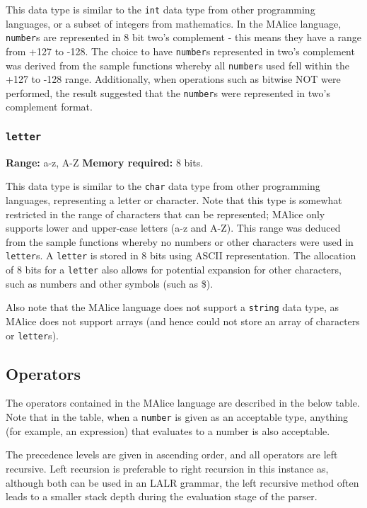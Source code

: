 \documentclass[a4wide, 10pt]{article}
\newcommand{\tab}{\hspace*{2em}}
\begin{document}
\tab This data type is similar to the \texttt{int} data type from other 
programming languages, or a subset of integers from mathematics. In the MAlice 
language, \texttt{number}s are represented in 8 bit two's complement - this
means they have a range from +127 to -128. The choice to have \texttt{number}s
represented in two's complement was derived from the sample functions whereby
all \texttt{number}s used fell within the +127 to -128 range. Additionally, when
operations such as bitwise NOT were performed, the result suggested that the 
\texttt{number}s were represented in two's complement format.

\subsubsection{\texttt{letter}}

{\bf Range:} a-z, A-Z {\bf Memory required:} 8 bits.

\tab This data type is similar to the \texttt{char} data type from other
programming languages, representing a letter or character. Note that this type
is somewhat restricted in the range of characters that can be represented; MAlice
only supports lower and upper-case letters (a-z and A-Z). This range was deduced
from the sample functions whereby no numbers or other characters were used in
\texttt{letter}s. A \texttt{letter} is stored in 8 bits using ASCII 
representation. The allocation of 8 bits for a \texttt{letter} also allows for
potential expansion for other characters, such as numbers and other symbols 
(such as \$).

Also note that the MAlice language does not support a \texttt{string} data 
type, as MAlice does not support arrays (and hence could not store an array of
characters or \texttt{letter}s).

\subsection{Operators}
The operators contained in the MAlice language are described in the below table.
Note that in the table, when a \texttt{number} is given as an acceptable type,
anything (for example, an expression) that evaluates to a number is also
acceptable.

The precedence levels are given in ascending order, and all operators are left
recursive. Left recursion is preferable to right recursion in this instance as,
although both can be used in an LALR grammar, the left recursive method often
leads to a smaller stack depth during the evaluation stage of the parser.
\cite{eac}
\end{document}
